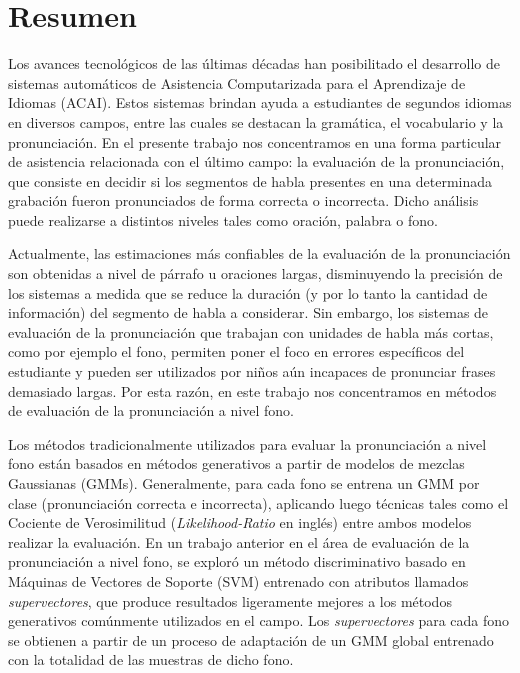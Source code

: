 \chapter*{Resumen}

Los avances tecnológicos de las últimas décadas han
posibilitado el desarrollo de sistemas
automáticos de Asistencia Computarizada para el Aprendizaje de Idiomas (ACAI).
Estos sistemas brindan ayuda a estudiantes de segundos idiomas
en diversos campos, entre las cuales se destacan la gramática, el vocabulario
y la pronunciación. En el presente trabajo nos concentramos en una forma
particular de asistencia relacionada con el último campo: la evaluación
de la pronunciación, que consiste en decidir si los segmentos de habla presentes
en una determinada
grabación fueron pronunciados de forma correcta o incorrecta. Dicho análisis
puede realizarse a distintos niveles tales como oración, palabra o fono.

Actualmente, las estimaciones más confiables de la evaluación de la pronunciación
son obtenidas a nivel de párrafo u oraciones largas, disminuyendo la precisión
de los sistemas a medida que se reduce la duración
(y por lo tanto la cantidad de información) del segmento de habla a considerar.
Sin embargo, los sistemas de evaluación de la pronunciación
que trabajan con unidades de habla
más cortas, como por ejemplo el fono,
permiten poner el foco en errores específicos del estudiante y
pueden ser utilizados por niños aún incapaces de pronunciar frases
demasiado largas. Por esta razón,
en este trabajo nos concentramos en métodos de evaluación de la pronunciación
a nivel fono.

Los métodos tradicionalmente utilizados para evaluar
la pronunciación a nivel fono
están basados en métodos generativos a partir de
modelos de mezclas Gaussianas (GMMs). Generalmente,
para cada fono se
entrena un GMM por clase (pronunciación correcta e incorrecta),
aplicando luego técnicas tales como el Cociente de
Verosimilitud (\textit{Likelihood-Ratio} en inglés) entre ambos modelos realizar
la evaluación. En un trabajo anterior en
el área de evaluación de la pronunciación a nivel fono,
se exploró
un método discriminativo basado en Máquinas de Vectores de Soporte (SVM) entrenado
con atributos llamados \textit{supervectores}, que produce resultados
ligeramente mejores a los métodos generativos comúnmente utilizados en el campo.
Los \textit{supervectores} para cada fono se obtienen
a partir de un proceso de adaptación de un
GMM global entrenado con la totalidad
de las muestras de dicho fono.

